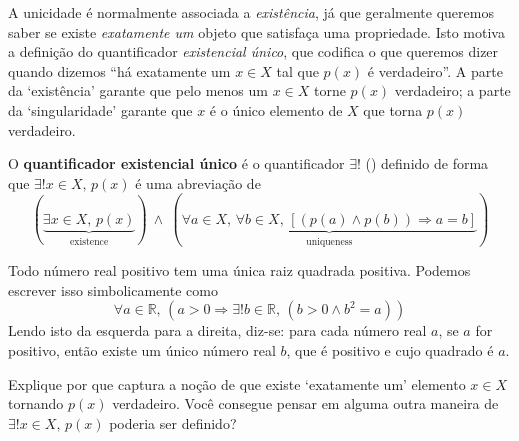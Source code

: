 A unicidade é normalmente associada a \textit{existência}, já que geralmente queremos saber se existe \textit{exatamente um} objeto que satisfaça uma propriedade. Isto motiva a definição do quantificador \textit{existencial único}, que codifica o que queremos dizer quando dizemos “há exatamente um $x \in X$ tal que $p(x)$ é verdadeiro”. A parte da `existência' garante que pelo menos um $x \in X$ torne $p(x)$ verdadeiro; a parte da `singularidade' garante que $x$ é o único elemento de $X$ que torna $p(x)$ verdadeiro.

\begin{definition}
\label{defUniqueExistentialQuantifier}
O \textbf{quantificador existencial único} é o quantificador $\exists !$ (\lindexmmc{\exists!}{$\exists!$}) definido de forma que $\exists ! x \in X,\, p(x)$ é uma abreviação de
\[(\underbrace{\exists x \in X,\, p(x)}_{\text{existence}}) ~ \wedge ~ (\underbrace{\forall a \in X,\, \forall b \in X,\, [(p(a) \wedge p(b)) \Rightarrow a=b]}_{\text{uniqueness}})\]
\end{definition}

\begin{example}
\label{exEveryPositiveRealHasUniqueSquareRoot}
Todo número real positivo tem uma única raiz quadrada positiva. Podemos escrever isso simbolicamente como
\[\forall a \in \mathbb{R},\, (a > 0 \Rightarrow \exists ! b \in \mathbb{R},\, (b > 0 \wedge b^2=a))\]
Lendo isto da esquerda para a direita, diz-se: para cada número real $a$, se $a$ for positivo, então existe um único número real $b$, que é positivo e cujo quadrado é $a$.
\end{example}

\begin{discussion}
Explique por que  captura a noção de que existe `exatamente um' elemento $x \in X$ tornando $p(x)$ verdadeiro. Você consegue pensar em alguma outra maneira de $\exists ! x \in X,\, p(x)$ poderia ser definido?
\end{discussion}


